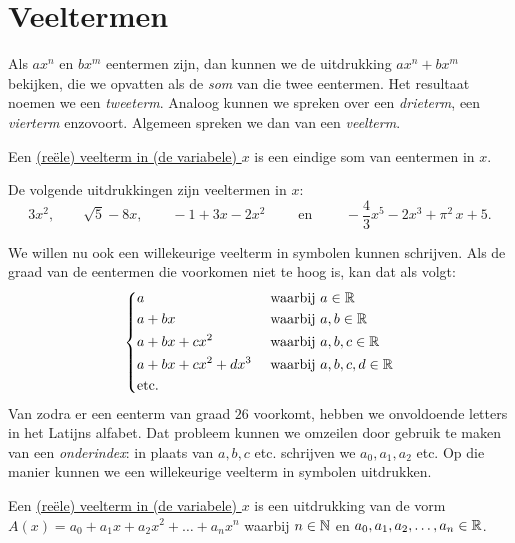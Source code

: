 \documentclass{ximera}
\begin{document}
\section{Veeltermen}

Als $ax^n$ en $bx^m$ eentermen zijn, dan kunnen we de uitdrukking $ax^n + bx^m$ bekijken, die we opvatten als de {\em som} van die twee eentermen. Het resultaat noemen we een {\em tweeterm}. Analoog kunnen we spreken over een {\em drieterm}, een {\em vierterm} enzovoort. Algemeen spreken we dan van een {\em veelterm}.

\begin{definition} 
Een \underline{(re\"ele) veelterm in (de variabele) $x$} is een eindige som van eentermen in $x$.
\end{definition} 

\begin{example} 
De volgende uitdrukkingen zijn veeltermen in $x$:
\[
3x^2, \qquad \sqrt{5} - 8x, \qquad -1 + 3x -2x^2 \qquad \text{ en } \qquad -\frac{4}{3}x^5 - 2x^3 + \pi^2\,x + 5. 
\]
\end{example} 

We willen nu ook een willekeurige veelterm in symbolen kunnen schrijven. Als de graad van de eentermen die voorkomen niet te hoog is, kan dat als volgt:
\begin{align*} 
\left\{
\begin{aligned}
& a && \text{ waarbij } a \in \mathbb{R}  \\
& a + bx && \text{ waarbij } a,b \in \mathbb{R}  \\
& a + bx + cx^2 && \text{ waarbij } a,b,c \in \mathbb{R}  \\
& a + bx + cx^2 + dx^3 && \text{ waarbij } a,b,c,d \in \mathbb{R} \\
& \text{etc.} && 
\end{aligned}
\right.
\end{align*}
Van zodra er een eenterm van graad $26$ voorkomt, hebben we onvoldoende letters in het Latijns alfabet. Dat probleem kunnen we omzeilen door gebruik te maken van een {\em onderindex}\:: in plaats van $a,b,c$ etc. schrijven we $a_0, a_1, a_2$ etc. Op die manier kunnen we een willekeurige veelterm in symbolen uitdrukken.

\begin{definition} 
Een \underline{(re\"ele) veelterm in (de variabele) $x$} is een uitdrukking van de vorm $A(x) = a_0 + a_1x + a_2x^2 + \dots + a_n x^n$ waarbij $n \in \mathbb{N}$ en $a_0,a_1,a_2,\ldots,a_n \in \mathbb{R}$.
\end{definition} 
\end{document}
